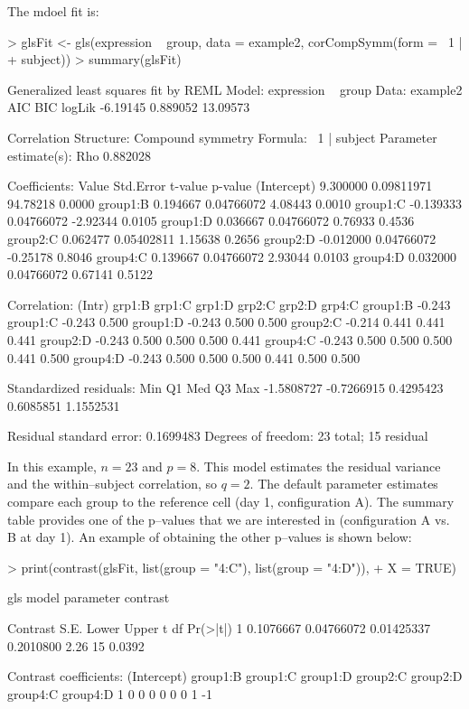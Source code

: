 \documentclass[12pt]{article}
\begin{document}
The mdoel fit is:
{\small
\begin{Schunk}
\begin{Sinput}
> glsFit <- gls(expression ~ group, data = example2, corCompSymm(form = ~1 | 
+     subject))
> summary(glsFit)
\end{Sinput}
\begin{Soutput}
Generalized least squares fit by REML
  Model: expression ~ group 
  Data: example2 
       AIC      BIC   logLik
  -6.19145 0.889052 13.09573

Correlation Structure: Compound symmetry
 Formula: ~1 | subject 
 Parameter estimate(s):
     Rho 
0.882028 

Coefficients:
                Value  Std.Error  t-value p-value
(Intercept)  9.300000 0.09811971 94.78218  0.0000
group1:B     0.194667 0.04766072  4.08443  0.0010
group1:C    -0.139333 0.04766072 -2.92344  0.0105
group1:D     0.036667 0.04766072  0.76933  0.4536
group2:C     0.062477 0.05402811  1.15638  0.2656
group2:D    -0.012000 0.04766072 -0.25178  0.8046
group4:C     0.139667 0.04766072  2.93044  0.0103
group4:D     0.032000 0.04766072  0.67141  0.5122

 Correlation: 
         (Intr) grp1:B grp1:C grp1:D grp2:C grp2:D grp4:C
group1:B -0.243                                          
group1:C -0.243  0.500                                   
group1:D -0.243  0.500  0.500                            
group2:C -0.214  0.441  0.441  0.441                     
group2:D -0.243  0.500  0.500  0.500  0.441              
group4:C -0.243  0.500  0.500  0.500  0.441  0.500       
group4:D -0.243  0.500  0.500  0.500  0.441  0.500  0.500

Standardized residuals:
       Min         Q1        Med         Q3        Max 
-1.5808727 -0.7266915  0.4295423  0.6085851  1.1552531 

Residual standard error: 0.1699483 
Degrees of freedom: 23 total; 15 residual
\end{Soutput}
\end{Schunk}
}
In this example, $n=23$ and $p=8$. This model estimates the residual variance and the within--subject correlation, so $q=2$. The default parameter estimates compare each group to the reference cell (day 1, configuration A). The summary table provides one of the p--values that we are interested in (configuration A vs. B at day 1). An example of obtaining the other p--values is shown below:
{\small
\begin{Schunk}
\begin{Sinput}
> print(contrast(glsFit, list(group = "4:C"), list(group = "4:D")), 
+     X = TRUE)
\end{Sinput}
\begin{Soutput}
gls model parameter contrast

   Contrast       S.E.      Lower     Upper    t df Pr(>|t|)
1 0.1076667 0.04766072 0.01425337 0.2010800 2.26 15   0.0392

Contrast coefficients:
  (Intercept) group1:B group1:C group1:D group2:C group2:D group4:C group4:D
1           0        0        0        0        0        0        1       -1
\end{Soutput}
\end{Schunk}
}
\end{document}
